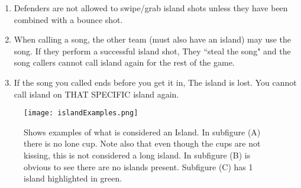 \begin{enumerate}[label=(\roman*), ref=\roman*]
            \item \label{sssec:IslandShots,swiping} Defenders are not allowed to swipe/grab island shots unless they have been combined with a bounce shot.
            \item \label{sssec:IslandShots,stelaing} When calling a  song, the other team (must also have an island) may use the song.
                If they perform a successful island shot, They ``steal the song" and the song callers cannot call island again for the rest of the game.
            \item \label{sssec:IslandShots,endsong} If the song you called ends before you get it in, The island is lost.
                You cannot call island on THAT SPECIFIC island again.
        \end{enumerate}
        \begin{figure}[H]
            \centering
            \texttt{[image: islandExamples.png]}
            \caption{Shows examples of what is considered an Island. In subfigure (A) there is no lone cup. Note also that even though the cups are not kissing, this is not considered a long island. In subfigure (B) is obvious to see there are no islands present. Subfigure (C) has 1 island highlighted in green.}
            \label{fig:islandExamples}
        \end{figure}
